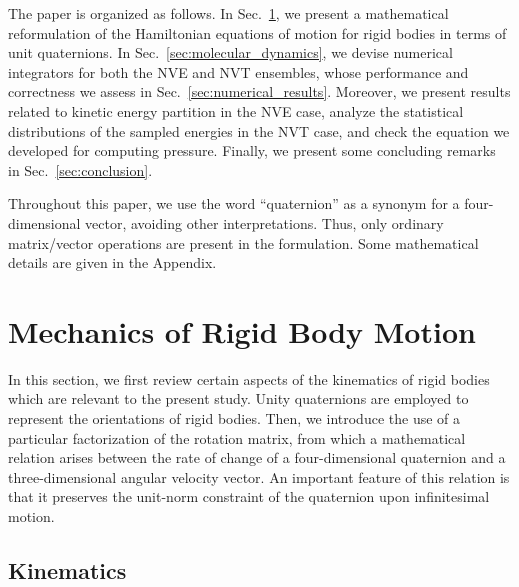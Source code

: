 \documentclass[aip,jcp,reprint,amsmath,amssymb,raggedbottom]{revtex4-1}
\begin{document}
The paper is organized as follows. In Sec.~\ref{sec:mechanics}, we present a mathematical reformulation of the Hamiltonian equations of motion for rigid bodies in terms of unit quaternions. In Sec.~\ref{sec:molecular_dynamics}, we devise numerical integrators for both the NVE and NVT ensembles, whose performance and correctness we assess in Sec.~\ref{sec:numerical_results}. Moreover, we present results related to kinetic energy partition in the NVE case, analyze the statistical distributions of the sampled energies in the NVT case, and check the equation we developed for computing pressure. Finally, we present some concluding remarks in Sec.~\ref{sec:conclusion}.

Throughout this paper, we use the word ``quaternion'' as a synonym for a four-dimensional vector, avoiding other interpretations. Thus, only ordinary matrix/vector operations are present in the formulation. Some mathematical details are given in the Appendix.

\section{Mechanics of Rigid Body Motion}
\label{sec:mechanics}

In this section, we first review certain aspects of the kinematics of rigid bodies which are relevant to the present study. Unity quaternions are employed to represent the orientations of rigid bodies. Then, we introduce the use of a particular factorization of the rotation matrix, from which a mathematical relation arises between the rate of change of a four-dimensional quaternion and a three-dimensional angular velocity vector. An important feature of this relation is that it preserves the unit-norm constraint of the quaternion upon infinitesimal motion.

\subsection{Kinematics}
\label{sec:kinematics}
\end{document}
